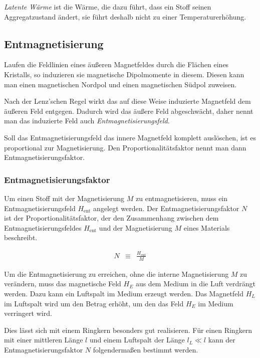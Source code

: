 \documentclass[12pt,a4paper]{scrartcl}
\numberwithin{equation}{section} %
\renewcommand{\[}{} %
\renewcommand{\]}{\noindent} %
\begin{document}
\emph{Latente Wärme} ist die Wärme, die dazu führt, dass ein Stoff
seinen Aggregatzustand ändert, sie führt deshalb nicht zu einer
Temperaturerhöhung.

\hypertarget{entmagnetisierung}{%
\subsection{Entmagnetisierung}\label{entmagnetisierung}}

Laufen die Feldlinien eines äußeren Magnetfeldes durch die Flächen eines
Kristalls, so induzieren sie magnetische Dipolmomente in diesem. Diesen
kann man einen magnetischen Nordpol und einen magnetischen Südpol
zuweisen.

Nach der Lenz'schen Regel wirkt das auf diese Weise induzierte
Magnetfeld dem äußeren Feld entgegen. Dadurch wird das äußere Feld
abgeschwächt, daher nennt man das induzierte Feld auch
\emph{Entmagnetisierungsfeld}.

Soll das Entmagnetisierungsfeld das innere Magnetfeld komplett
auslöschen, ist es proportional zur Magnetisierung. Den
Proportionalitätsfaktor nennt man dann Entmagnetisierungsfaktor.

\hypertarget{entmagnetisierungsfaktor}{%
\subsubsection{Entmagnetisierungsfaktor}\label{entmagnetisierungsfaktor}}

Um einen Stoff mit der Magnetisierung \(M\) zu entmagnetisieren, muss
ein Entmagnetisierungsfeld \(H_\mathrm{ent}\) angelegt werden. Der
Entmagnetisierungsfaktor \(N\) ist der Proportionalitätsfaktor, der den
Zusammenhang zwischen dem Entmagnetisierungsfeldes \(H_\mathrm{ent}\)
und der Magnetisierung \(M\) eines Materials beschreibt.

\[
\begin{eqnarray}
    N &\equiv& \frac{H_\mathrm{ent}}{M}
\end{eqnarray}
\]

Um die Entmagnetisierung zu erreichen, ohne die interne Magnetisierung
\(M\) zu verändern, muss das magnetische Feld \(H_E\) aus dem Medium in
die Luft verdrängt werden. Dazu kann ein Luftspalt im Medium erzeugt
werden. Das Magnetfeld \(H_L\) im Luftspalt wird um den Betrag erhöht,
um den das Feld \(H_E\) im Medium verringert wird.

Dies lässt sich mit einem Ringkern besonders gut realisieren. Für einen
Ringkern mit einer mittleren Länge \(l\) und einem Luftspalt der Länge
\(l_L\ll l\) kann der Entmagnetisierungsfaktor \(N\) folgendermaßen
bestimmt werden.
\end{document}
